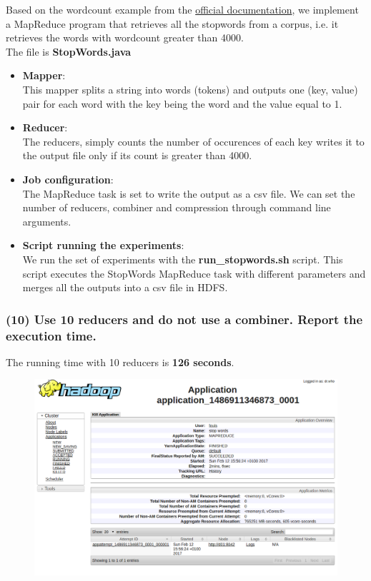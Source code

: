 \documentclass[a4paper,10pt]{article}
\begin{document}
Based on the wordcount example from the \href{https://hadoop.apache.org/docs/stable/hadoop-mapreduce-client/hadoop-mapreduce-client-core/MapReduceTutorial.html}{official documentation},
we implement a MapReduce program that retrieves all the stopwords from a corpus,
i.e. it retrieves the words with wordcount greater than 4000.
\\The file is \textbf{StopWords.java}
\begin{itemize}
  \item \textbf{Mapper}:\\
  This mapper splits a string into words (tokens) and outputs one (key, value) pair
  for each word with the key being the word and the value equal to 1.
  
  \item \textbf{Reducer}:\\
  The reducers, simply counts the number of occurences of each key writes it to
  the output file only if its count is greater than 4000.
  
  \item \textbf{Job configuration}:\\
  The MapReduce task is set to write the output as a csv file.
  We can set the number of reducers, combiner and compression through command line
  arguments.
  
  \item \textbf{Script running the experiments}:\\
  We run the set of experiments with the \textbf{run\_stopwords.sh} script.
  This script executes the StopWords MapReduce task with different parameters
  and merges all the outputs into a csv file in HDFS.
  
\end{itemize}

\subsubsection{(10) Use 10 reducers and do not use a combiner. Report the execution time.}
The running time with 10 reducers is \textbf{126 seconds}.
\begin{figure}[H]
  \centering
  \includegraphics[width=.6\textwidth]{stopwords_10_reducers.png}
\end{figure}
\end{document}
